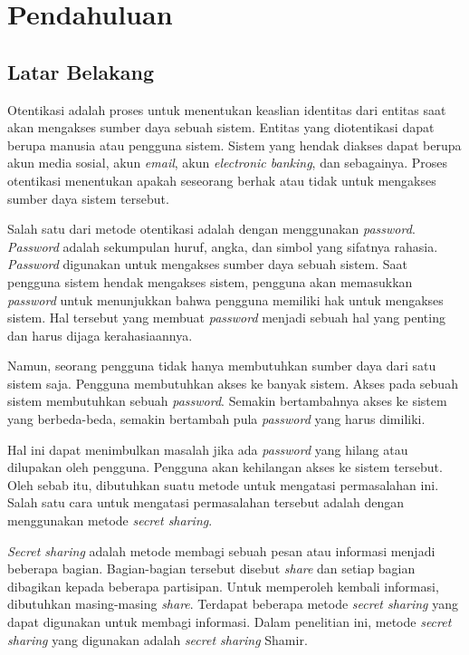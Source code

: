 \chapter{Pendahuluan} \label{chap:Pendahuluan}

\section{Latar Belakang}
\label{sec:latarbelakang}

Otentikasi adalah proses untuk menentukan keaslian identitas dari entitas saat akan mengakses sumber daya sebuah sistem. Entitas yang diotentikasi dapat berupa manusia atau pengguna sistem. Sistem yang hendak diakses dapat berupa akun media sosial, akun \textit{email}, akun \textit{electronic banking}, dan sebagainya. Proses otentikasi menentukan apakah seseorang berhak atau tidak untuk mengakses sumber daya sistem tersebut.

Salah satu dari metode otentikasi adalah dengan menggunakan \textit{password}. \textit{Password} adalah sekumpulan huruf, angka, dan simbol yang sifatnya rahasia. \textit{Password} digunakan untuk mengakses sumber daya sebuah sistem. Saat pengguna sistem hendak mengakses sistem, pengguna akan memasukkan \textit{password} untuk menunjukkan bahwa pengguna memiliki hak untuk mengakses sistem.
Hal tersebut yang membuat \textit{password} menjadi sebuah hal yang penting dan harus dijaga kerahasiaannya.

Namun, seorang pengguna tidak hanya membutuhkan sumber daya dari satu sistem saja. Pengguna membutuhkan akses ke banyak sistem. Akses pada sebuah sistem membutuhkan sebuah \textit{password}. Semakin bertambahnya akses ke sistem yang berbeda-beda, semakin bertambah pula \textit{password} yang harus dimiliki.

Hal ini dapat menimbulkan masalah jika ada \textit{password} yang hilang atau dilupakan oleh pengguna. Pengguna akan kehilangan akses ke sistem tersebut. Oleh sebab itu, dibutuhkan suatu metode untuk mengatasi permasalahan ini. Salah satu cara untuk mengatasi permasalahan tersebut adalah dengan menggunakan metode \textit{secret sharing}.

\textit{Secret sharing} adalah metode membagi sebuah pesan atau informasi menjadi beberapa bagian. Bagian-bagian tersebut disebut \textit{share} dan setiap bagian dibagikan kepada beberapa partisipan. Untuk memperoleh kembali informasi, dibutuhkan masing-masing \textit{share}. Terdapat beberapa metode \textit{secret sharing} yang dapat digunakan untuk membagi informasi. Dalam penelitian ini, metode \textit{secret sharing} yang digunakan adalah \textit{secret sharing} Shamir.

